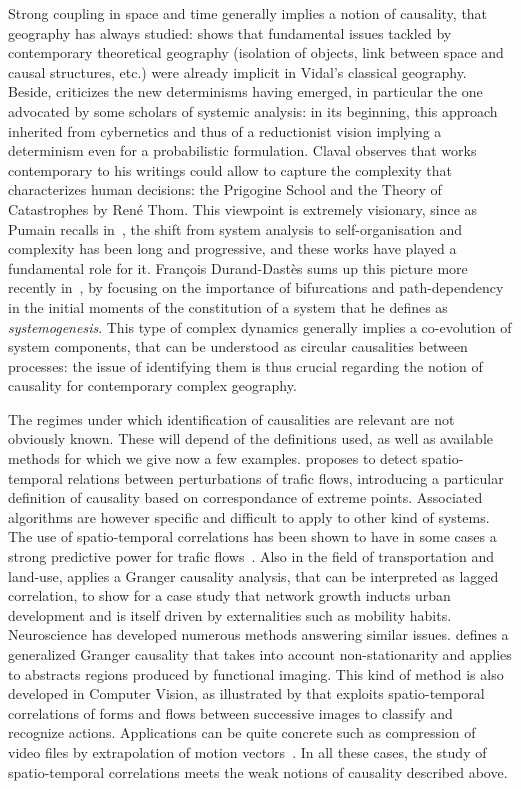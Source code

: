 \documentclass[english]{./sageo}
\begin{document}
Strong coupling in space and time generally implies a notion of causality, that geography has always studied: \cite{loi1985etude} shows that fundamental issues tackled by contemporary theoretical geography (isolation of objects, link between space and causal structures, etc.) were already implicit in Vidal's classical geography. Beside, \cite{claval1985causalite} criticizes the new determinisms having emerged, in particular the one advocated by some scholars of systemic analysis: in its beginning, this approach inherited from cybernetics and thus of a reductionist vision implying a determinism even for a probabilistic formulation. Claval observes that works contemporary to his writings could allow to capture the complexity that characterizes human decisions: the Prigogine School and the Theory of Catastrophes by René Thom. This viewpoint is extremely visionary, since as Pumain recalls in~\cite{pumain2003approche}, the shift from system analysis to self-organisation and complexity has been long and progressive, and these works have played a fundamental role for it. François Durand-Dastès sums up this picture more recently in~\cite{durand2003geographes}, by focusing on the importance of bifurcations and path-dependency in the initial moments of the constitution of a system that he defines as \emph{systemogenesis}. This type of complex dynamics generally implies a co-evolution of system components, that can be understood as circular causalities between processes: the issue of identifying them is thus crucial regarding the notion of causality for contemporary complex geography.


The regimes under which identification of causalities are relevant are not obviously known. These will depend of the definitions used, as well as available methods for which we give now a few examples. \cite{liu2011discovering} proposes to detect spatio-temporal relations between perturbations of trafic flows, introducing a particular definition of causality based on correspondance of extreme points. Associated algorithms are however specific and difficult to apply to other kind of systems. The use of spatio-temporal correlations has been shown to have in some cases a strong predictive power for trafic flows~\cite{min2011real}. Also in the field of transportation and land-use, \cite{xie2009streetcars} applies a Granger causality analysis, that can be interpreted as lagged correlation, to show for a case study that network growth inducts urban development and is itself driven by externalities such as mobility habits. Neuroscience has developed numerous methods answering similar issues. \cite{luo2013spatio} defines a generalized Granger causality that takes into account non-stationarity and applies to abstracts regions produced by functional imaging. This kind of method is also developed in Computer Vision, as illustrated by \cite{ke2007spatio} that exploits spatio-temporal correlations of forms and flows between successive images to classify and recognize actions. Applications can be quite concrete such as compression of video files by extrapolation of motion vectors~\cite{chalidabhongse1997fast}. In all these cases, the study of spatio-temporal correlations meets the weak notions of causality described above.
\end{document}
